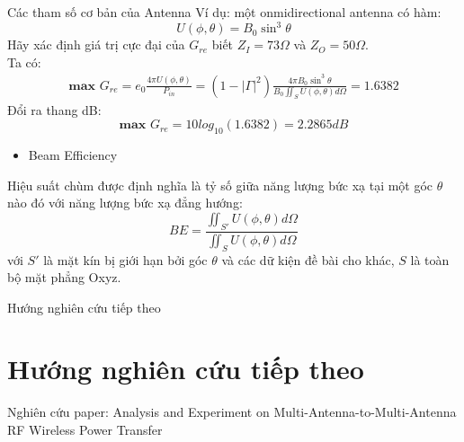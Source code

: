\documentclass[8pt]{beamer}
\begin{document}
\begin{frame}{Các tham số cơ bản của Antenna}
Ví dụ: một onmidirectional antenna có hàm: $$U(\phi,\theta)=B_{0}\sin^3{\theta}$$
Hãy xác định giá trị cực đại của $G_{re}$ biết $Z_{I}=73\Omega$ và $Z_{O}=50\Omega$.
\\  Ta có:
\begin{equation*}
\begin{split}
	\textbf{max }G_{re}=e_{0}\frac{4\pi U(\phi,\theta)}{P_{in}}=(1-|\Gamma|^2)\frac{4\pi B_{0}\sin^3{\theta}}{B_{0}\iint_{S}U(\phi,\theta)d\Omega}=1.6382
\end{split}
\end{equation*}
Đổi ra thang dB: $$\textbf{max }G_{re}=10log_{10}(1.6382)=2.2865dB$$
\begin{itemize}
	\item  Beam Efficiency
\end{itemize}
 Hiệu suất chùm được định nghĩa là tỷ số giữa năng lượng bức xạ tại một góc $\theta$ nào đó với năng lượng bức xạ đẳng hướng:
 $$BE=\frac{\iint_{S'}U(\phi,\theta)d\Omega}{\iint_{S}U(\phi,\theta)d\Omega}$$
 với $S'$ là mặt kín bị giới hạn bởi góc $\theta$ và các dữ kiện đề bài cho khác, $S$ là toàn bộ mặt phẳng Oxyz.
\end{frame}
\begin{frame}{Hướng nghiên cứu tiếp theo}
	\section{Hướng nghiên cứu tiếp theo}
Nghiên cứu paper: Analysis and Experiment on Multi-Antenna-to-Multi-Antenna RF Wireless Power Transfer
\end{frame}
\end{document}
